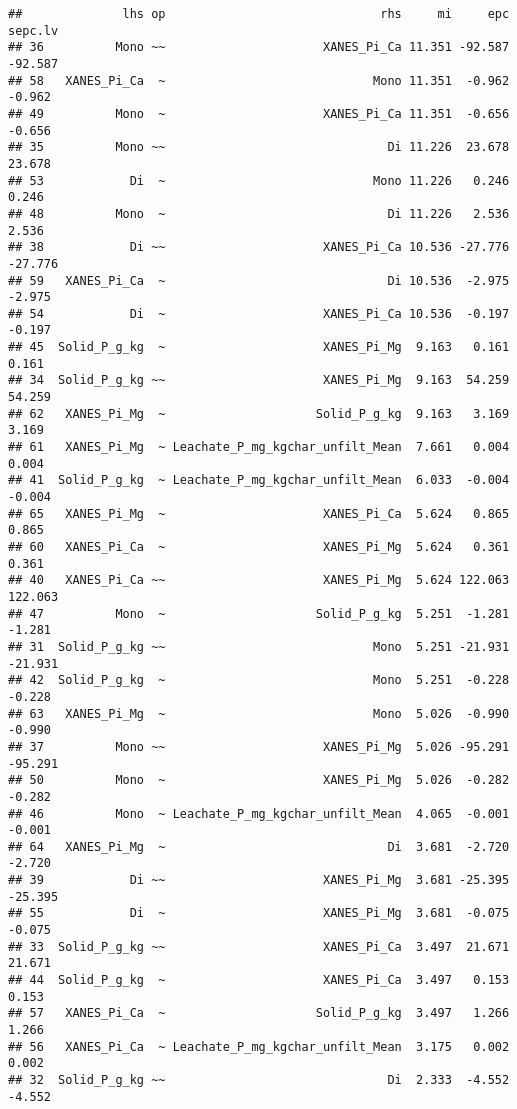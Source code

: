 \documentclass[
]{article}
\begin{document}
\begin{verbatim}
##              lhs op                              rhs     mi     epc sepc.lv
## 36          Mono ~~                      XANES_Pi_Ca 11.351 -92.587 -92.587
## 58   XANES_Pi_Ca  ~                             Mono 11.351  -0.962  -0.962
## 49          Mono  ~                      XANES_Pi_Ca 11.351  -0.656  -0.656
## 35          Mono ~~                               Di 11.226  23.678  23.678
## 53            Di  ~                             Mono 11.226   0.246   0.246
## 48          Mono  ~                               Di 11.226   2.536   2.536
## 38            Di ~~                      XANES_Pi_Ca 10.536 -27.776 -27.776
## 59   XANES_Pi_Ca  ~                               Di 10.536  -2.975  -2.975
## 54            Di  ~                      XANES_Pi_Ca 10.536  -0.197  -0.197
## 45  Solid_P_g_kg  ~                      XANES_Pi_Mg  9.163   0.161   0.161
## 34  Solid_P_g_kg ~~                      XANES_Pi_Mg  9.163  54.259  54.259
## 62   XANES_Pi_Mg  ~                     Solid_P_g_kg  9.163   3.169   3.169
## 61   XANES_Pi_Mg  ~ Leachate_P_mg_kgchar_unfilt_Mean  7.661   0.004   0.004
## 41  Solid_P_g_kg  ~ Leachate_P_mg_kgchar_unfilt_Mean  6.033  -0.004  -0.004
## 65   XANES_Pi_Mg  ~                      XANES_Pi_Ca  5.624   0.865   0.865
## 60   XANES_Pi_Ca  ~                      XANES_Pi_Mg  5.624   0.361   0.361
## 40   XANES_Pi_Ca ~~                      XANES_Pi_Mg  5.624 122.063 122.063
## 47          Mono  ~                     Solid_P_g_kg  5.251  -1.281  -1.281
## 31  Solid_P_g_kg ~~                             Mono  5.251 -21.931 -21.931
## 42  Solid_P_g_kg  ~                             Mono  5.251  -0.228  -0.228
## 63   XANES_Pi_Mg  ~                             Mono  5.026  -0.990  -0.990
## 37          Mono ~~                      XANES_Pi_Mg  5.026 -95.291 -95.291
## 50          Mono  ~                      XANES_Pi_Mg  5.026  -0.282  -0.282
## 46          Mono  ~ Leachate_P_mg_kgchar_unfilt_Mean  4.065  -0.001  -0.001
## 64   XANES_Pi_Mg  ~                               Di  3.681  -2.720  -2.720
## 39            Di ~~                      XANES_Pi_Mg  3.681 -25.395 -25.395
## 55            Di  ~                      XANES_Pi_Mg  3.681  -0.075  -0.075
## 33  Solid_P_g_kg ~~                      XANES_Pi_Ca  3.497  21.671  21.671
## 44  Solid_P_g_kg  ~                      XANES_Pi_Ca  3.497   0.153   0.153
## 57   XANES_Pi_Ca  ~                     Solid_P_g_kg  3.497   1.266   1.266
## 56   XANES_Pi_Ca  ~ Leachate_P_mg_kgchar_unfilt_Mean  3.175   0.002   0.002
## 32  Solid_P_g_kg ~~                               Di  2.333  -4.552  -4.552

\end{verbatim}
\end{document}
